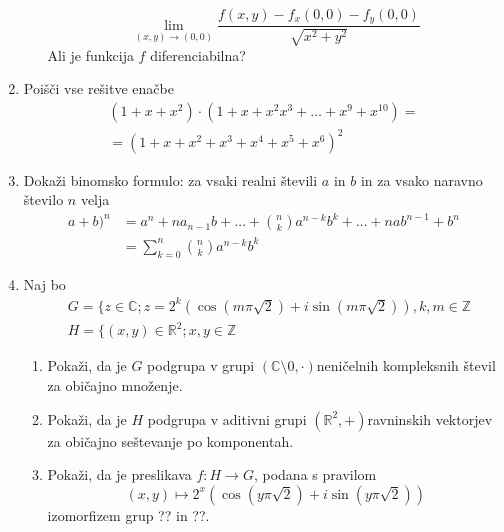 \documentclass[a4paper,12pt]{article}
\newcommand{\bfrac}[2]{\genfrac{(}{)}{0pt}{}{#1}{#2}}
\begin{document}
\begin{enumerate}
\begin{itemize}
\[ \lim_{(x,y)\to (0,0)}\dfrac{f(x,y) - f_x (0,0) - f_y (0,0)}{\sqrt{x^2 + y^2}}            \]
    Ali je funkcija $f$ diferenciabilna?
\end{itemize}
\item Poišči vse rešitve enačbe
\begin{multline*}
     (1 + x + x^2) \cdot (1 + x + x^2 x^3 + \dots + x^9 + x^{10}) = \\ =(1 + x + x^2 + x^3 + x^4 + x^5 + x^6)^2
\end{multline*}
\item Dokaži binomsko formulo: za vsaki realni števili $a$ in $b$ in za vsako naravno število $n$ velja
\begin{equation*}
    \begin{aligned}
        a+b)^n &= a^n + na_{n-1}b + \dots + \bfrac{n}{k}a^{n-k}b^k + \dots + nab^{n-1} + b^n \\
         &= \sum_{k=0}^n \bfrac{n}{k}a^{n-k}b^k
    \end{aligned}
\end{equation*}
\item Naj bo
\begin{equation*}
    \begin{aligned}
        &G = \{z \in \mathbb{C}; z=2^k(\cos(m\pi \sqrt{2})+ i\sin(m\pi \sqrt{2})),k,m \in \mathbb{Z}\\
    &H = \{(x,y) \in \mathbb{R}^2; x,y \in \mathbb{Z}
    \end{aligned}
\end{equation*}
\begin{enumerate}
    \item Pokaži, da je $G$ podgrupa v grupi $(\mathbb{C}\setminus {0},\cdot)$neničelnih kompleksnih števil za običajno množenje.
    \item Pokaži, da je $H$ podgrupa v aditivni grupi $(\mathbb{R}^2,+)$ravninskih vektorjev za običajno seštevanje po komponentah.
    \item Pokaži, da je preslikava $f: H \to G$, podana s pravilom
    \[ (x,y) \mapsto  2^x(\cos(y\pi \sqrt{2}) + i\sin(y\pi \sqrt{2}))  \]
    izomorfizem grup ?? in ??.
\end{enumerate}


\end{enumerate}
\end{document}
